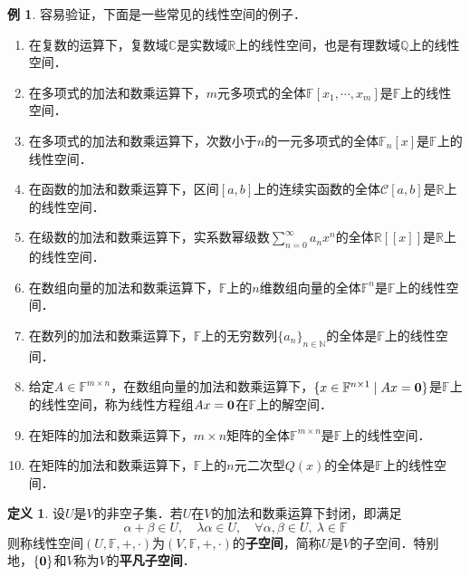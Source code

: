 \documentclass[a4paper,fontset=windows]{ctexbook}
\theoremstyle{definition}
\newtheorem{definition}{定义}[chapter]
\newtheorem{example}{例}[chapter]
\begin{document}
\begin{example}
容易验证，下面是一些常见的线性空间的例子．
\begin{enumerate}
\item 在复数的运算下，复数域$\mathbb{C}$是实数域$\mathbb{R}$上的线性空间，也是有理数域$\mathbb{Q}$上的线性空间．

\item 在多项式的加法和数乘运算下，$m$元多项式的全体$\mathbb{F}[x_1,\cdots,x_m]$是$\mathbb{F}$上的线性空间．

\item 在多项式的加法和数乘运算下，次数小于$n$的一元多项式的全体$\mathbb{F}_n[x]$是$\mathbb{F}$上的线性空间．

\item 在函数的加法和数乘运算下，区间$[a,b]$上的连续实函数的全体$\mathscr{C}[a,b]$是$\mathbb{R}$上的线性空间．

\item 在级数的加法和数乘运算下，实系数幂级数$\sum\limits_{n=0}^\infty a_nx^n$的全体$\mathbb{R}[[x]]$是$\mathbb{R}$上的线性空间．

\item 在数组向量的加法和数乘运算下，$\mathbb{F}$上的$n$维数组向量的全体$\mathbb{F}^n$是$\mathbb{F}$上的线性空间．

\item 在数列的加法和数乘运算下，$\mathbb{F}$上的无穷数列$\{a_n\}_{n\in\mathbb{N}}$的全体是$\mathbb{F}$上的线性空间．

\item 给定$A\in\mathbb{F}^{m\times n}$，在数组向量的加法和数乘运算下，$\{x\in\mathbb{F}^{n\times 1}\mid Ax={\bf 0}\}$是$\mathbb{F}$上的线性空间，称为线性方程组$Ax={\bf 0}$在$\mathbb{F}$上的解空间．

\item 在矩阵的加法和数乘运算下，$m\times n$矩阵的全体$\mathbb{F}^{m\times n}$是$\mathbb{F}$上的线性空间．

\item 在矩阵的加法和数乘运算下，$\mathbb{F}$上的$n$元二次型$Q(x)$的全体是$\mathbb{F}$上的线性空间．
\end{enumerate}
\end{example}

\begin{definition}
设$U$是$V$的非空子集．若$U$在$V$的加法和数乘运算下封闭，即满足
$$\alpha+\beta\in U,\quad\lambda\alpha\in U,\quad\forall\alpha,\beta\in U,~\lambda\in\mathbb{F}$$
则称线性空间$(U,\mathbb{F},+,\cdot)$为$(V,\mathbb{F},+,\cdot)$的{\bf 子空间}，简称$U$是$V$的子空间．特别地，$\{\bf 0\}$和$V$称为$V$的{\bf 平凡子空间}．
\end{definition}
\end{document}
